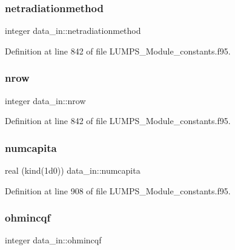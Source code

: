 \mbox{\label{namespacedata__in_a0b433ad2361360f657c537b128e4a5f7}} 
\subsubsection{\texorpdfstring{netradiationmethod}{netradiationmethod}}
{\footnotesize\ttfamily integer data\+\_\+in\+::netradiationmethod}



Definition at line 842 of file L\+U\+M\+P\+S\+\_\+\+Module\+\_\+constants.\+f95.

\mbox{\label{namespacedata__in_ab7209967962bb333a35a29bb6a24eb36}} 
\subsubsection{\texorpdfstring{nrow}{nrow}}
{\footnotesize\ttfamily integer data\+\_\+in\+::nrow}



Definition at line 842 of file L\+U\+M\+P\+S\+\_\+\+Module\+\_\+constants.\+f95.

\mbox{\label{namespacedata__in_a6121773c8a8acb40d4c9501422264e15}} 
\subsubsection{\texorpdfstring{numcapita}{numcapita}}
{\footnotesize\ttfamily real (kind(1d0)) data\+\_\+in\+::numcapita}



Definition at line 908 of file L\+U\+M\+P\+S\+\_\+\+Module\+\_\+constants.\+f95.

\mbox{\label{namespacedata__in_a27bd8e1db530bad815c128979003c184}} 
\subsubsection{\texorpdfstring{ohmincqf}{ohmincqf}}
{\footnotesize\ttfamily integer data\+\_\+in\+::ohmincqf}



